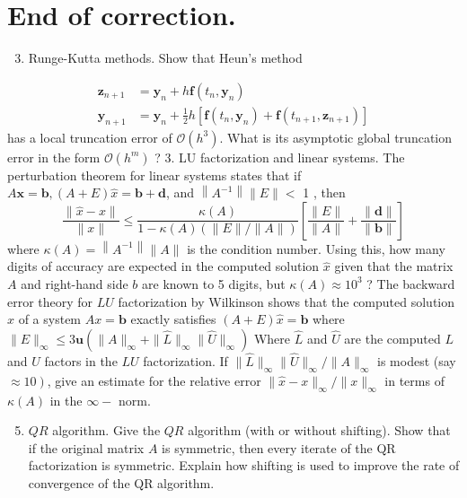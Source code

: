\documentclass[10pt]{article}
\begin{document}
\section{End of correction.}
\begin{enumerate}
  \setcounter{enumi}{2}
  \item Runge-Kutta methods. Show that Heun's method
\end{enumerate}
$$
\begin{aligned}
\mathbf{z}_{n+1} &=\mathbf{y}_{n}+h \mathbf{f}\left(t_{n}, \mathbf{y}_{n}\right) \\
\mathbf{y}_{n+1} &=\mathbf{y}_{n}+\frac{1}{2} h\left[\mathbf{f}\left(t_{n}, \mathbf{y}_{n}\right)+\mathbf{f}\left(t_{n+1}, \mathbf{z}_{n+1}\right)\right]
\end{aligned}
$$
has a local truncation error of $\mathcal{O}\left(h^{3}\right)$. What is its asymptotic global truncation error in the form $\mathcal{O}\left(h^{m}\right)$ ? 3. LU factorization and linear systems. The perturbation theorem for linear systems states that if $A \boldsymbol{x}=\boldsymbol{b},(A+E) \widehat{x}=\boldsymbol{b}+\boldsymbol{d}$, and $\left\|A^{-1}\right\|\|E\|<$ 1 , then
$$
\frac{\|\widehat{x}-x\|}{\|x\|} \leq \frac{\kappa(A)}{1-\kappa(A)(\|E\| /\|A\|)}\left[\frac{\|E\|}{\|A\|}+\frac{\|\boldsymbol{d}\|}{\|\boldsymbol{b}\|}\right]
$$
where $\kappa(A)=\left\|A^{-1}\right\|\|A\|$ is the condition number. Using this, how many digits of accuracy are expected in the computed solution $\hat{x}$ given that the matrix $A$ and right-hand side $b$ are known to 5 digits, but $\kappa(A) \approx 10^{3}$ ? The backward error theory for $L U$ factorization by Wilkinson shows that the computed solution $\widehat{x}$ of a system $A x=\boldsymbol{b}$ exactly satisfies $(A+E) \widehat{x}=\boldsymbol{b}$ where $\|E\|_{\infty} \leq 3 \mathbf{u}\left(\|A\|_{\infty}+\|\widehat{L}\|_{\infty}\|\widehat{U}\|_{\infty}\right)$ Where $\hat{L}$ and $\widehat{U}$ are the computed $L$ and $U$ factors in the $L U$ factorization. If $\|\widehat{L}\|_{\infty}\|\widehat{U}\|_{\infty} /\|A\|_{\infty}$ is modest (say $\left.\approx 10\right)$, give an estimate for the relative error $\|\widehat{x}-x\|_{\infty} /\|x\|_{\infty}$ in terms of $\kappa(A)$ in the $\infty-$ norm.

\begin{enumerate}
  \setcounter{enumi}{4}
  \item $Q R$ algorithm. Give the $Q R$ algorithm (with or without shifting). Show that if the original matrix $A$ is symmetric, then every iterate of the QR factorization is symmetric. Explain how shifting is used to improve the rate of convergence of the QR algorithm.
\end{enumerate}
\end{document}
